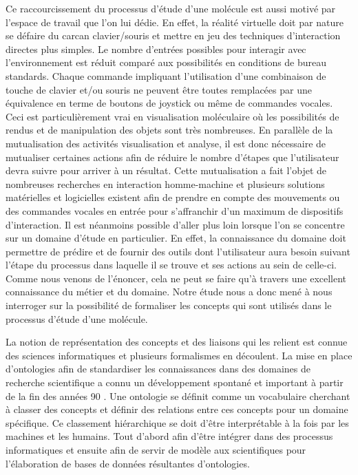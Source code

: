 Ce raccourcissement du processus d'étude d'une molécule est aussi motivé par l'espace de travail que l'on lui dédie. En effet, la réalité virtuelle doit par nature se défaire du carcan clavier/souris et mettre en jeu des techniques d'interaction directes plus simples. Le nombre d'entrées possibles pour interagir avec l'environnement est réduit comparé aux possibilités en conditions de bureau standards. Chaque commande impliquant l'utilisation d'une combinaison de touche de clavier et/ou souris ne peuvent être toutes remplacées par une équivalence en terme de boutons de joystick ou même de commandes vocales. Ceci est particulièrement vrai en visualisation moléculaire où les possibilités de rendus et de manipulation des objets sont très nombreuses. En parallèle de la mutualisation des activités visualisation et analyse, il est donc nécessaire de mutualiser certaines actions afin de réduire le nombre d'étapes que l'utilisateur devra suivre pour arriver à un résultat. Cette mutualisation a fait l'objet de nombreuses recherches en interaction homme-machine et plusieurs solutions matérielles et logicielles existent afin de prendre en compte des mouvements ou des commandes vocales en entrée pour s'affranchir d'un maximum de dispositifs d'interaction. 
Il est néanmoins possible d'aller plus loin lorsque l'on se concentre sur un domaine d'étude en particulier. En effet, la connaissance du domaine doit permettre de prédire et de fournir des outils dont l'utilisateur aura besoin suivant l'étape du processus dans laquelle il se trouve et ses actions au sein de celle-ci. Comme nous venons de l'énoncer, cela ne peut se faire qu'à travers une excellent connaissance du métier et du domaine. Notre étude nous a donc mené à nous interroger sur la possibilité de formaliser les concepts qui sont utilisés dans le processus d'étude d'une molécule.

La notion de représentation des concepts et des liaisons qui les relient est connue des sciences informatiques et plusieurs formalismes en découlent. La mise en place d'ontologies afin de standardiser les connaissances dans des domaines de recherche scientifique a connu un développement spontané et important à partir de la fin des années 90 \cite{schulze-kremer_ontologies_2002, baker_ontology_1999}. Une ontologie se définit comme un vocabulaire cherchant à classer des concepts et définir des relations entre ces concepts pour un domaine spécifique. Ce classement hiérarchique se doit d'être interprétable à la fois par les machines et les humains. Tout d'abord afin d'être intégrer dans des processus informatiques et ensuite afin de servir de modèle aux scientifiques pour l'élaboration de bases de données résultantes d'ontologies.

